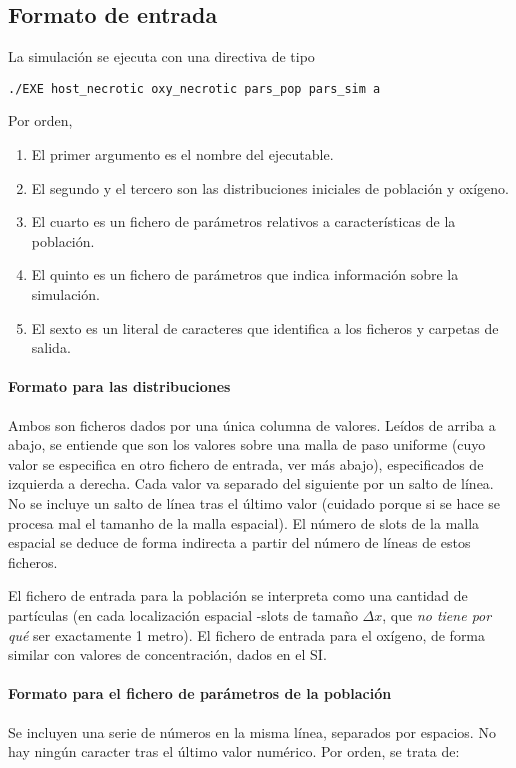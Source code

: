 \documentclass[12pt]{article}
\numberwithin{equation}{section}
\begin{document}
\subsection{Formato de entrada}
La simulaci\'on se ejecuta con una directiva de tipo
\begin{verbatim}
./EXE host_necrotic oxy_necrotic pars_pop pars_sim a
\end{verbatim}
Por orden,
\begin{enumerate}
\item El primer argumento es el nombre del ejecutable.
\item El segundo y el tercero son las distribuciones iniciales de poblaci\'on y ox\'igeno.
\item El cuarto es un fichero de par\'ametros relativos a caracter\'isticas de la poblaci\'on.
\item El quinto es un fichero de par\'ametros que indica informaci\'on sobre la simulaci\'on.
\item El sexto es un literal de caracteres que identifica a los ficheros y carpetas de salida.
\end{enumerate}

\paragraph{Formato para las distribuciones}
Ambos son ficheros dados por una \'unica columna de valores. Le\'idos de arriba a abajo, se entiende que son los valores sobre una malla de paso uniforme (cuyo valor se especifica en otro fichero de entrada, ver m\'as abajo), especificados de izquierda a derecha. Cada valor va separado del siguiente por un salto de l\'inea. No se incluye un salto de l\'inea tras el \'ultimo valor (cuidado porque si se hace se procesa mal el tamanho de la malla espacial). El n\'umero de slots de la malla espacial se deduce de forma indirecta a partir del n\'umero de l\'ineas de estos ficheros.

El fichero de entrada para la poblaci\'on se interpreta como una cantidad de part\'iculas (en cada localizaci\'on espacial -slots de tama\~no $\Delta x$, que {\em no tiene por qu\'e} ser exactamente 1 metro). El fichero de entrada para el ox\'igeno, de forma similar con valores de concentraci\'on, dados en el SI. 


\paragraph{Formato para el fichero de par\'ametros de la poblaci\'on}
Se incluyen una serie de n\'umeros en la misma l\'inea, separados por espacios. No hay ning\'un caracter tras el \'ultimo valor num\'erico. Por orden, se trata de:
\end{document}
